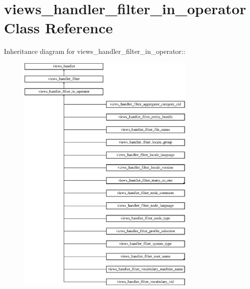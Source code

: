 \hypertarget{classviews__handler__filter__in__operator}{
\section{views\_\-handler\_\-filter\_\-in\_\-operator Class Reference}
\label{classviews__handler__filter__in__operator}
}
Inheritance diagram for views\_\-handler\_\-filter\_\-in\_\-operator::\begin{figure}[H]
\begin{center}
\leavevmode
\includegraphics[height=12cm]{classviews__handler__filter__in__operator}
\end{center}
\end{figure}
